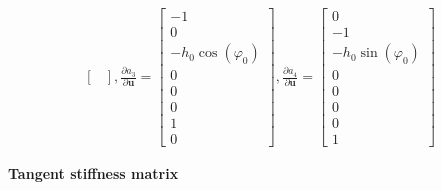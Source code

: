 \begin{align*}
\begin{bmatrix}
\end{bmatrix},
\frac{\partial a_3}{\partial \boldsymbol{u}} =
\begin{bmatrix}
-1\\ 0\\ -h_0 \cos(\varphi_0)\\ 0\\ 0\\ 0\\ 1\\ 0
\end{bmatrix},
\frac{\partial a_4}{\partial \boldsymbol{u}} =
\begin{bmatrix}
0\\ -1\\ -h_0 \sin(\varphi_0)\\ 0\\ 0\\ 0\\ 0\\ 1
\end{bmatrix}
\end{align*}

\textbf{Tangent stiffness matrix}

